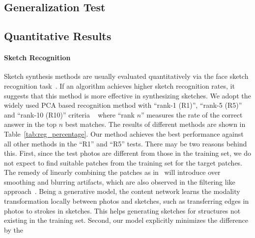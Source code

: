 \documentclass[10pt,twocolumn,letterpaper]{article}
\begin{document}
\subsection{Generalization Test}

\subsection{Quantitative Results}

\paragraph*{Sketch Recognition} Sketch synthesis methods are usually evaluated quantitatively  via the face sketch recognition task~\cite{song2014real,wang2009face,zhang2015end,zhou2012markov}. If an algorithm achieves higher sketch recognition rates, it suggests that this method is more effective in synthesizing sketches. We adopt the widely used PCA based recognition method with ``rank-1 (R1)'', ``rank-5 (R5)'' and ``rank-10 (R10)'' criteria ~\cite{wang2009face} where ``rank $n$'' measures the rate of the correct answer in the top $n$ best matches. The results of different methods are shown in Table~\ref{tab:reg_percentage}. Our method achieves the best performance against all other methods in the ``R1'' and ``R5'' tests. There may be two reasons behind this. First, since the test photos are different from those in the training set, we do not expect to find suitable patches from the training set for the target patches. The remedy of linearly combining the patches as in~\cite{zhou2012markov} will introduce over smoothing and blurring artifacts, which are also observed in the filtering like approach~\cite{song2014real}. Being a generative model, the content network learns the modality transformation locally between photos and sketches, such as transferring edges in photos to strokes in sketches. This helps generating sketches for structures not existing in the training set. Second, our model explicitly minimizes the difference by the 
\end{document}
